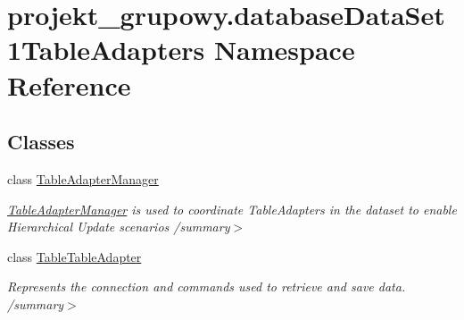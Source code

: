 \hypertarget{namespaceprojekt__grupowy_1_1database_data_set1_table_adapters}{}\section{projekt\+\_\+grupowy.\+database\+Data\+Set1\+Table\+Adapters Namespace Reference}
\label{namespaceprojekt__grupowy_1_1database_data_set1_table_adapters}
\subsection*{Classes}
\begin{DoxyCompactItemize}
\item 
class \hyperlink{classprojekt__grupowy_1_1database_data_set1_table_adapters_1_1_table_adapter_manager}{Table\+Adapter\+Manager}
\begin{DoxyCompactList}\small\item\em \hyperlink{classprojekt__grupowy_1_1database_data_set1_table_adapters_1_1_table_adapter_manager}{Table\+Adapter\+Manager} is used to coordinate Table\+Adapters in the dataset to enable Hierarchical Update scenarios /summary$>$ \end{DoxyCompactList}\item 
class \hyperlink{classprojekt__grupowy_1_1database_data_set1_table_adapters_1_1_table_table_adapter}{Table\+Table\+Adapter}
\begin{DoxyCompactList}\small\item\em Represents the connection and commands used to retrieve and save data. /summary$>$ \end{DoxyCompactList}\end{DoxyCompactItemize}
